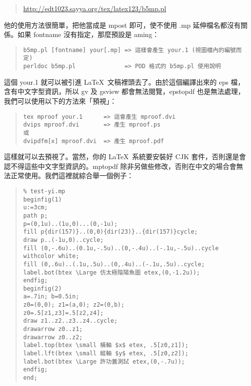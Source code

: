 \begin{quote}
  \url{http://edt1023.sayya.org/tex/latex123/b5mp.pl}
\end{quote}

他的使用方法很簡單，把他當成是 {\ttfamily mpost} 即可，使不使用 {\ttfamily .mp} 延伸檔名都沒有關係。如果 {\ttfamily fontname} 沒有指定，那麼預設是 {\ttfamily aming}：

\begin{quote}
  \begin{verbatim}
b5mp.pl [fontname] your[.mp] => 這樣會產生 your.1 (視圖檔內的編號而定)
perldoc b5mp.pl              => POD 格式的 b5mp.pl 使用說明
\end{verbatim}
\end{quote}

這個 {\ttfamily your.1} 就可以被引進 \LaTeX\ 文稿裡頭去了。由於這個編譯出來的 eps 檔，含有中文字型資訊，所以 {\ttfamily gv} 及 {\ttfamily gsview} 都會無法閱覽，{\ttfamily epstopdf} 也是無法處理，我們可以使用以下的方法來「預視」：

\begin{quote}
  \begin{verbatim}
tex mproof your.1      => 這會產生 mproof.dvi
dvips mproof.dvi       => 產生 mproof.ps
或
dvipdfm[x] mproof.dvi  => 產生 mproof.pdf
\end{verbatim}
\end{quote}

這樣就可以去預視了。當然，你的 \LaTeX\ 系統要安裝好 {\sffamily CJK} 套件，否則還是會認不得這些中文字型資訊的。{\ttfamily mptopdf} 除非另做些修改，否則在中文的場合會無法正常使用。我們這裡就綜合舉一個例子：

\begin{quote}
  \begin{verbatim}
% test-yi.mp
beginfig(1)
u:=3cm;
path p;
p=(0,1u)..(1u,0)...(0,-1u);
fill p{dir(157)}..(0,0){dir(23)}..{dir(157)}cycle;
draw p..(-1u,0)..cycle;
fill (0,-.6u)..(0.1u,-.5u)..(0,-.4u)..(-.1u,-.5u)..cycle withcolor white;
fill (0,.6u)..(.1u,.5u)..(0,.4u)..(-.1u,.5u)..cycle;
label.bot(btex \Large 仿太極陰陽魚圖 etex,(0,-1.2u));
endfig;
beginfig(2)
a=.7in; b=0.5in;
z0=(0,0); z1=(a,0); z2=(0,b);
z0=.5[z1,z3]=.5[z2,z4];
draw z1..z2..z3..z4..cycle;
drawarrow z0..z1;
drawarrow z0..z2;
label.top(btex \small 橫軸 $x$ etex, .5[z0,z1]);
label.lft(btex \small 縱軸 $y$ etex, .5[z0,z2]);
label.bot(btex \Large 許功蓋測試 etex,(0,-.7u));
endfig;
end;
\end{verbatim}
\end{quote}

